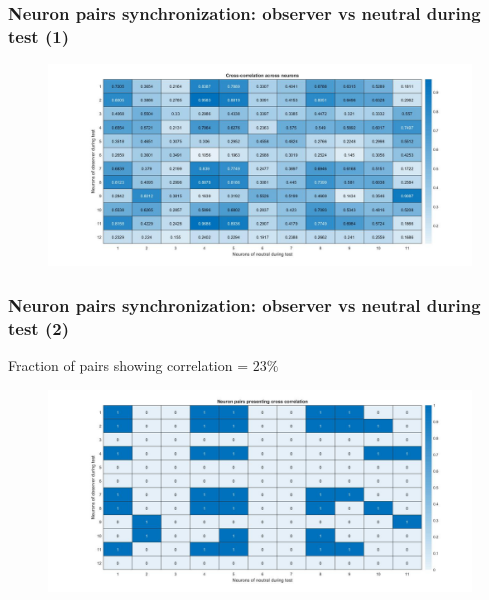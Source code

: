 \documentclass{beamer}
\begin{document}
\begin{frame}
\frametitle{Neuron pairs synchronization: observer vs neutral during test (1)}





\begin{figure}[H]
	\begin{center}
		\hspace*{-1cm}
		\includegraphics[scale=.30]{cc_heatmap3.jpg} 
	\end{center}  
	
	
\end{figure}


\end{frame}	




\begin{frame}
\frametitle{Neuron pairs synchronization: observer vs neutral during test (2)}


Fraction of pairs showing correlation = $23\%$


\begin{figure}[H]
\begin{center}
	\hspace*{-1cm}
	\includegraphics[scale=.30]{cc_active3.jpg} 
\end{center}  


\end{figure}


\end{frame}
\end{document}
